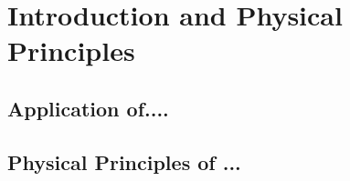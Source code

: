 \section{Introduction and Physical Principles}
\label{sec:Introduction}



\subsection{Application of....}
\label{sec:Application}


\subsection{Physical Principles of ...}
\label{sec:PhysicalPrinciples}


